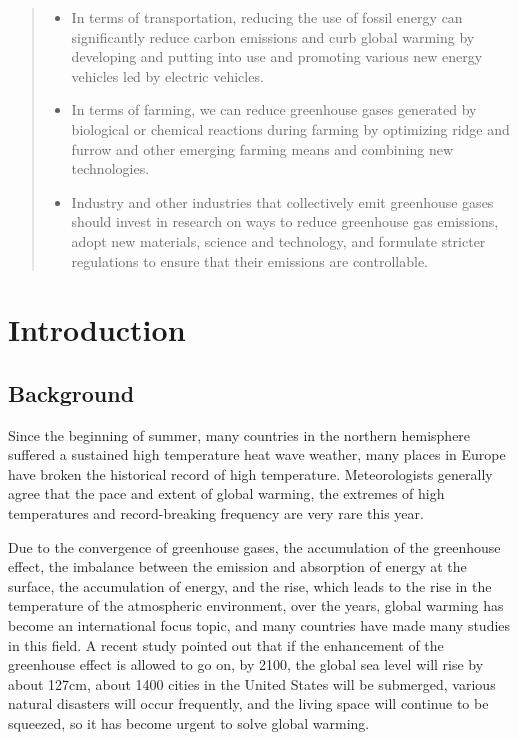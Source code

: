 \documentclass{apmcmthesis}
\begin{document}
\begin{abstract}
\begin{itemize}
  \item  In terms of transportation, reducing the use of fossil energy can significantly reduce carbon emissions and curb global warming by developing and putting into use and promoting various new energy vehicles led by electric vehicles.
  \item In terms of farming, we can reduce greenhouse gases generated by biological or chemical reactions during farming by optimizing ridge and furrow and other emerging farming means and combining new technologies.
  \item Industry and other industries that collectively emit greenhouse gases should invest in research on ways to reduce greenhouse gas emissions, adopt new materials, science and technology, and formulate stricter regulations to ensure that their emissions are controllable.
\end{itemize}
\end{abstract}



\newpage
\tableofcontents


\newpage
\pagestyle{mainmatterstyle}
\setcounter{page}{1}
\section{Introduction}
\subsection{Background}
Since the beginning of summer, many countries in the northern hemisphere suffered a sustained high temperature heat wave weather, many places in Europe have broken the historical record of high temperature. Meteorologists generally agree that the pace and extent of global warming, the extremes of high temperatures and record-breaking frequency are very rare this year.

Due to the convergence of greenhouse gases, the accumulation of the greenhouse effect, the imbalance between the emission and absorption of energy at the surface, the accumulation of energy, and the rise, which leads to the rise in the temperature of the atmospheric environment, over the years, global warming has become an international focus topic, and many countries have made many studies in this field. A recent study\cite{1} pointed out that if the enhancement of the greenhouse effect is allowed to go on, by 2100, the global sea level will rise by about 127cm, about 1400 cities in the United States will be submerged, various natural disasters will occur frequently, and the living space will continue to be squeezed, so it has become urgent to solve global warming.
\end{document}
